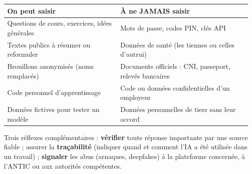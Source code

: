 \documentclass[11pt]{article}
\begin{document}
\begin{aretenir}
\begin{center}
\begin{tabularx}{\linewidth}{|X|X|}
\hline
\rowcolor{popgreenL} \textbf{On peut saisir} & \textbf{À ne JAMAIS saisir} \\
\hline
Questions de cours, exercices, idées générales & Mots de passe, codes PIN, clés API \\
\hline
Textes publics à résumer ou reformuler & Données de santé (les tiennes ou celles d'autrui) \\
\hline
Brouillons anonymisés (noms remplacés) & Documents officiels : CNI, passeport, relevés bancaires \\
\hline
Code personnel d'apprentissage & Code ou données confidentielles d'un employeur \\
\hline
Données fictives pour tester un modèle & Données personnelles de tiers sans leur accord \\
\hline
\end{tabularx}
\end{center}
Trois réflexes complémentaires : \textbf{vérifier} toute réponse importante par une source fiable ; assurer la \textbf{traçabilité} (indiquer quand et comment l'IA a été utilisée dans un travail) ; \textbf{signaler} les abus (arnaques, deepfakes) à la plateforme concernée, à l'ANTIC ou aux autorités compétentes.
\end{aretenir}
\end{document}
